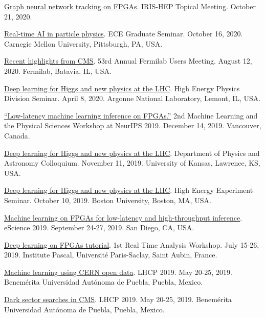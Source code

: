 \documentclass{res}
\begin{document}
\begin{resume}
  \href{https://indico.cern.ch/event/955026/}{Graph neural network tracking on FPGAs}. IRIS-HEP Topical Meeting. October 21, 2020.

  \href{https://www.cs.cmu.edu/calendar/fri-2020-10-16-1200/ece-graduate-seminar}{Real-time AI in particle physics}. ECE Graduate Seminar. October 16, 2020. Carnegie Mellon University, Pittsburgh, PA, USA.

  \href{https://indico.fnal.gov/event/23109/contributions/193292/}{Recent highlights from CMS}. 53rd Annual Fermilab Users Meeting. August 12, 2020. Fermilab, Batavia, IL, USA.

  \href{https://indico.fnal.gov/event/22961/}{Deep learning for Higgs and new physics at the LHC}. High Energy Physics Division Seminar. April 8, 2020. Argonne National Laboratory, Lemont, IL, USA.

  \href{https://ml4physicalsciences.github.io/2019/files/NeurIPS_ML4PS_2019_74.pdf}{``Low-latency machine learning inference on FPGAs.''} 2nd Machine Learning and the Physical Sciences Workshop at NeurIPS 2019.  December 14, 2019. Vancouver, Canada.

  \href{https://physics.drupal.ku.edu/calendar/colloquia#/?i=2}{Deep learning for Higgs and new physics at the LHC}. Department of Physics and Astronomy Colloquium. November 11, 2019. University of Kansas, Lawrence, KS, USA.

  \href{http://physics.bu.edu/events/show/2204}{Deep learning for Higgs and new physics at the LHC}. High Energy Experiment Seminar. October 10, 2019. Boston University, Boston, MA, USA.

  \href{https://escience2019.sdsc.edu/program}{Machine learning on FPGAs for low-latency and high-throughput inference}. eScience 2019. September 24-27, 2019. San Diego, CA, USA.

  \href{https://indico.cern.ch/event/793125/contributions/3495251/}{Deep learning on FPGAs tutorial}. 1st Real Time Analysis Workshop. July 15-26, 2019. Institute Pascal, Universit\'{e} Paris-Saclay, Saint Aubin, France.

  \href{https://indico.cern.ch/event/687651/contributions/3428206/}{Machine learning using CERN open data}. LHCP 2019. May 20-25, 2019. Benem\'{e}rita Universidad Aut\'{o}noma de Puebla, Puebla, Mexico.

  \href{https://indico.cern.ch/event/687651/contributions/3426898/}{Dark sector searches in CMS}. LHCP 2019. May 20-25, 2019. Benem\'{e}rita Universidad Aut\'{o}noma de Puebla, Puebla, Mexico.


\end{resume}
\end{document}
